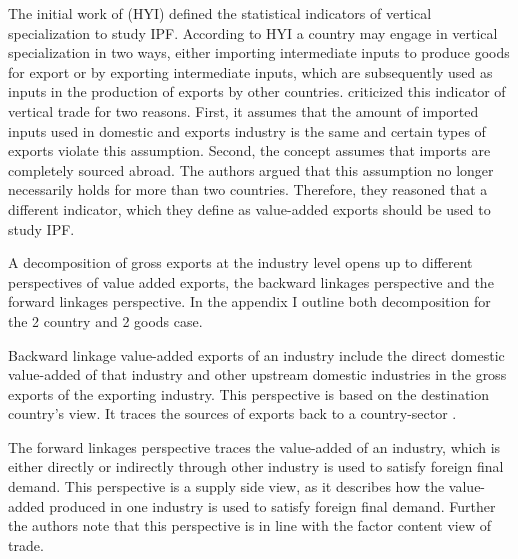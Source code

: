 The initial work of \textcite{Hummels} (HYI) defined the statistical indicators of vertical specialization to study IPF.  According to HYI a country may engage in vertical specialization in two ways, either importing intermediate inputs to produce goods for export or by exporting intermediate inputs, which are subsequently used as inputs in the production of exports by other countries.  \textcite{Koopman} criticized this indicator of vertical trade for two reasons. First, it assumes that the amount of imported inputs used in domestic and exports industry is the same and certain types of exports violate this assumption. Second, the concept assumes that imports are completely sourced abroad. The authors argued that this assumption no longer necessarily holds for more than two countries. Therefore, they reasoned that a different indicator, which they define as  value-added exports should be used to study IPF. %
\par
A decomposition of gross exports at the industry level opens up to different perspectives of value added exports, the backward linkages perspective and the forward linkages perspective\textcite{wang2013}.  In the appendix I outline both decomposition for the 2 country and 2 goods case. \par 
Backward linkage value-added exports of an industry include the direct domestic value-added of that industry and other upstream domestic industries in the gross exports of the exporting industry. This perspective is based on the destination country's view. It traces the sources of exports back to a country-sector \textcite{wang2013}. \par The forward linkages perspective  traces the value-added of an industry, which is either directly or indirectly  through other industry is used to satisfy foreign final demand. This perspective is a supply side view, as it describes how the value-added produced in one industry is used to satisfy foreign final demand\textcite{wang2013}. Further the authors note that this perspective is in line with the factor content view of trade. 
\par
